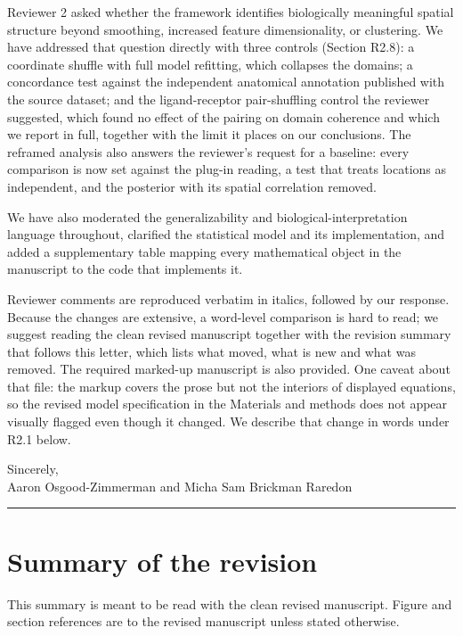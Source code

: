 \documentclass[11pt]{article}
\begin{document}
Reviewer 2 asked whether the framework identifies biologically meaningful spatial structure
beyond smoothing, increased feature dimensionality, or clustering. We have addressed that
question directly with three controls (Section R2.8): a coordinate shuffle with full model
refitting, which collapses the domains; a concordance test against the independent anatomical
annotation published with the source dataset; and the ligand-receptor pair-shuffling control
the reviewer suggested, which found no effect of the pairing on domain coherence and which we
report in full, together with the limit it places on our conclusions. The reframed analysis
also answers the reviewer's request for a baseline: every comparison is now set against the
plug-in reading, a test that treats locations as independent, and the posterior with its
spatial correlation removed.

We have also moderated the generalizability and biological-interpretation language
throughout, clarified the statistical model and its implementation, and added a
supplementary table mapping every mathematical object in the manuscript to the code that
implements it.

Reviewer comments are reproduced verbatim in italics, followed by our response. Because the
changes are extensive, a word-level comparison is hard to read; we suggest reading the clean
revised manuscript together with the revision summary that follows this letter, which lists
what moved, what is new and what was removed. The required marked-up manuscript is also
provided. One caveat about that file: the markup covers the prose but not the interiors of
displayed equations, so the revised model specification in the Materials and methods does not
appear visually flagged even though it changed. We describe that change in words under R2.1
below.

\medskip
\noindent Sincerely,\\
Aaron Osgood-Zimmerman and Micha Sam Brickman Raredon

\vspace{1em}
\hrule

\section*{Summary of the revision}

\noindent This summary is meant to be read with the clean revised manuscript. Figure and section
references are to the revised manuscript unless stated otherwise.
\end{document}
